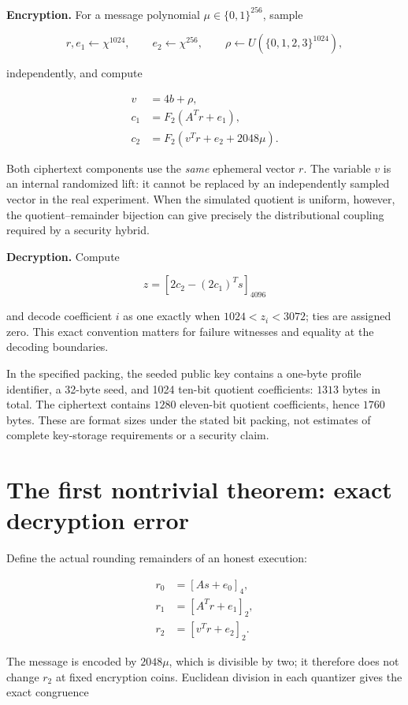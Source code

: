 \documentclass[
  11pt,
  a4paper,
  oneside]{report}
\begin{document}
\textbf{Encryption.} For a message polynomial \(\mu\in\{0,1\}^{256}\),
sample

\[
 r,e_1\leftarrow\chi^{1024},\qquad
 e_2\leftarrow\chi^{256},\qquad
 \rho\leftarrow U(\{0,1,2,3\}^{1024}),
\]

independently, and compute

\[
\begin{aligned}
 v&=4b+\rho,\\
 c_1&=F_2(A^Tr+e_1),\\
 c_2&=F_2(v^Tr+e_2+2048\mu).
\end{aligned}
\]

Both ciphertext components use the \emph{same} ephemeral vector \(r\).
The variable \(v\) is an internal randomized lift: it cannot be replaced
by an independently sampled vector in the real experiment. When the
simulated quotient is uniform, however, the quotient--remainder
bijection can give precisely the distributional coupling required by a
security hybrid.

\textbf{Decryption.} Compute

\[
 z=[2c_2-(2c_1)^Ts]_{4096}
\]

and decode coefficient \(i\) as one exactly when \(1024<z_i<3072\); ties
are assigned zero. This exact convention matters for failure witnesses
and equality at the decoding boundaries.

In the specified packing, the seeded public key contains a one-byte
profile identifier, a 32-byte seed, and 1024 ten-bit quotient
coefficients: \(1313\) bytes in total. The ciphertext contains \(1280\)
eleven-bit quotient coefficients, hence \(1760\) bytes. These are format
sizes under the stated bit packing, not estimates of complete
key-storage requirements or a security claim.

\section{The first nontrivial theorem: exact decryption
error}\label{the-first-nontrivial-theorem-exact-decryption-error}

Define the actual rounding remainders of an honest execution:

\[
\begin{aligned}
 r_0&=[As+e_0]_4,\\
 r_1&=[A^Tr+e_1]_2,\\
 r_2&=[v^Tr+e_2]_2.
\end{aligned}
\]

The message is encoded by \(2048\mu\), which is divisible by two; it
therefore does not change \(r_2\) at fixed encryption coins. Euclidean
division in each quantizer gives the exact congruence
\end{document}
